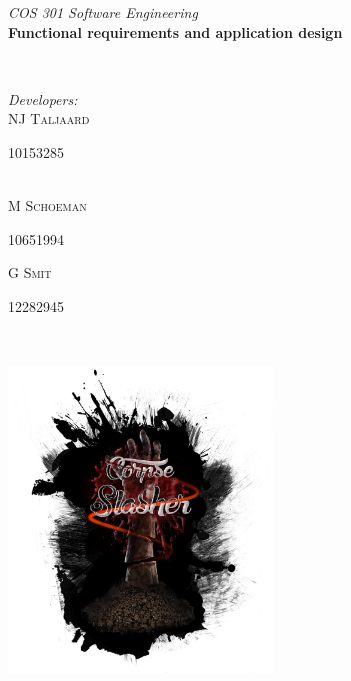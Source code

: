 \documentclass[letterpaper]{article}
\makeatletter
\def\printauthor{%
    {\large \@author}}
\makeatother
\begin{document}
\begin{titlepage}
\begin{center}
\begin{minipage}{0.4\textwidth}
\begin{flushleft} \large
\emph{COS 301 Software Engineering}\\
\vspace{1cm}
\textbf{Functional requirements and application design}
\end{flushleft}
\end{minipage}
~
\begin{minipage}{0.4\textwidth}
	\begin{flushright} \large
	\emph{Developers:} \\
		NJ \textsc{Taljaard} \\
			\begin{small}
				10153285
			\end{small} \\
		M  \textsc{Schoeman} \\
			\begin{small}
				10651994 \\
			\end{small}
		G  \textsc{Smit} \\
			\begin{small}
				12282945
			\end{small}
	\end{flushright}
\end{minipage}\\



\includegraphics[width=70mm, height=90mm]{corpseslasher.png}\\ %
 

\end{center}
\end{titlepage}
\end{document}
